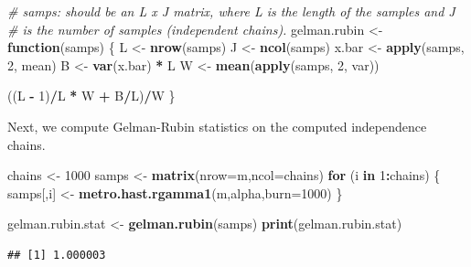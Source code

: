 \documentclass[
  11pt,
]{paper}
\newenvironment{Shaded}{\begin{snugshade}}{\end{snugshade}}
\newcommand{\AttributeTok}[1]{\textcolor[rgb]{0.13,0.29,0.53}{#1}}
\newcommand{\CommentTok}[1]{\textcolor[rgb]{0.56,0.35,0.01}{\textit{#1}}}
\newcommand{\ControlFlowTok}[1]{\textcolor[rgb]{0.13,0.29,0.53}{\textbf{#1}}}
\newcommand{\DecValTok}[1]{\textcolor[rgb]{0.00,0.00,0.81}{#1}}
\newcommand{\FunctionTok}[1]{\textcolor[rgb]{0.13,0.29,0.53}{\textbf{#1}}}
\newcommand{\NormalTok}[1]{#1}
\newcommand{\OtherTok}[1]{\textcolor[rgb]{0.56,0.35,0.01}{#1}}
\newcommand{\SpecialCharTok}[1]{\textcolor[rgb]{0.81,0.36,0.00}{\textbf{#1}}}
\begin{document}
\begin{Shaded}
\begin{Highlighting}[]
\CommentTok{\# samps: should be an L x J matrix, where L is the length of the samples and J}
\CommentTok{\# is the number of samples (independent chains).}
\NormalTok{gelman.rubin }\OtherTok{\textless{}{-}} \ControlFlowTok{function}\NormalTok{(samps) \{}
\NormalTok{    L }\OtherTok{\textless{}{-}} \FunctionTok{nrow}\NormalTok{(samps)}
\NormalTok{    J }\OtherTok{\textless{}{-}} \FunctionTok{ncol}\NormalTok{(samps)}
\NormalTok{    x.bar }\OtherTok{\textless{}{-}} \FunctionTok{apply}\NormalTok{(samps, }\DecValTok{2}\NormalTok{, mean)}
\NormalTok{    B }\OtherTok{\textless{}{-}} \FunctionTok{var}\NormalTok{(x.bar) }\SpecialCharTok{*}\NormalTok{ L}
\NormalTok{    W }\OtherTok{\textless{}{-}} \FunctionTok{mean}\NormalTok{(}\FunctionTok{apply}\NormalTok{(samps, }\DecValTok{2}\NormalTok{, var))}

\NormalTok{    ((L }\SpecialCharTok{{-}} \DecValTok{1}\NormalTok{)}\SpecialCharTok{/}\NormalTok{L }\SpecialCharTok{*}\NormalTok{ W }\SpecialCharTok{+}\NormalTok{ B}\SpecialCharTok{/}\NormalTok{L)}\SpecialCharTok{/}\NormalTok{W}
\NormalTok{\}}
\end{Highlighting}
\end{Shaded}

Next, we compute Gelman-Rubin statistics on the computed independence
chains.

\begin{Shaded}
\begin{Highlighting}[]
\NormalTok{chains }\OtherTok{\textless{}{-}} \DecValTok{1000}
\NormalTok{samps }\OtherTok{\textless{}{-}} \FunctionTok{matrix}\NormalTok{(}\AttributeTok{nrow=}\NormalTok{m,}\AttributeTok{ncol=}\NormalTok{chains)}
\ControlFlowTok{for}\NormalTok{ (i }\ControlFlowTok{in} \DecValTok{1}\SpecialCharTok{:}\NormalTok{chains)}
\NormalTok{\{}
\NormalTok{  samps[,i] }\OtherTok{\textless{}{-}} \FunctionTok{metro.hast.rgamma1}\NormalTok{(m,alpha,}\AttributeTok{burn=}\DecValTok{1000}\NormalTok{)}
\NormalTok{\}}

\NormalTok{gelman.rubin.stat }\OtherTok{\textless{}{-}} \FunctionTok{gelman.rubin}\NormalTok{(samps)}
\FunctionTok{print}\NormalTok{(gelman.rubin.stat)}
\end{Highlighting}
\end{Shaded}

\begin{verbatim}
## [1] 1.000003
\end{verbatim}
\end{document}
